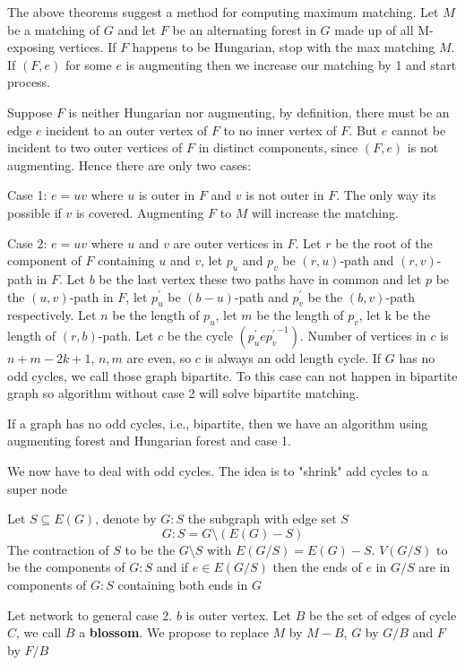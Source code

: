 			The above theorems suggest a method for computing maximum matching. Let $M$ be a matching of $G$ and let $F$ be an alternating forest in $G$ made up of all M-exposing vertices. If $F$ happens to be Hungarian, stop with the max matching $M$. If $(F, e)$ for some $e$ is augmenting then we increase our matching by 1 and start process.

			Suppose $F$ is neither Hungarian nor augmenting, by definition, there must be an edge $e$ incident to an outer vertex of $F$ to no inner vertex of $F$. But $e$ cannot be incident to two outer vertices of $F$ in distinct components, since $(F, e)$ is not augmenting. Hence there are only two cases:

			Case 1: $e=uv$ where $u$ is outer in $F$ and $v$ is not outer in $F$. The only way its possible if $v$ is covered. Augmenting $F$ to $M$ will increase the matching. 

			Case 2: $e=uv$ where $u$ and $v$ are outer vertices in $F$. Let $r$ be the root of the component of $F$ containing $u$ and $v$, let $p_u$ and $p_v$ be $(r,u)$-path and $(r, v)$-path in $F$. Let $b$ be the last vertex these two paths have in common and let $p$ be the $(u, v)$-path in $F$, let $p_u^\prime$ be $(b-u)$-path and $p_v^\prime$ be the $(b,v)$-path respectively. Let $n$ be the length of $p_u$, let $m$ be the length of $p_v$, let k be the length of $(r, b)$-path. Let $c$ be the cycle $(p_u^\prime e {p_v^{\prime}}^{-1})$. Number of vertices in $c$ is $n + m-2k + 1$, $n, m$ are even, so $c$ is always an odd length cycle. If $G$ has no odd cycles, we call those graph bipartite. To this case can not happen in bipartite graph so algorithm without case 2 will solve bipartite matching.

			If a graph has no odd cycles, i.e., bipartite, then we have an algorithm using augmenting forest and Hungarian forest and case 1.

			We now have to deal with odd cycles. The idea is to "shrink" add cycles to a super node

			Let $S\subseteq E(G)$, denote by $G: S$ the subgraph with edge set $S$
			\begin{equation}
				G:S = G\setminus (E(G)-S)
			\end{equation}
			The contraction of $S$ to be the $G\setminus S$ with $E(G / S) = E(G) - S$. $V(G/S)$ to be the components of $G:S$ and if $e\in E(G/S)$ then the ends of $e$ in $G/S$ are in components of $G:S$ containing both ends in $G$

			Let network to general case 2. $b$ is outer vertex. Let $B$ be the set of edges of cycle $C$, we call $B$ a \textbf{blossom}. We propose to replace $M$ by $M - B$, $G$ by $G/B$ and $F$ by $F/B$

